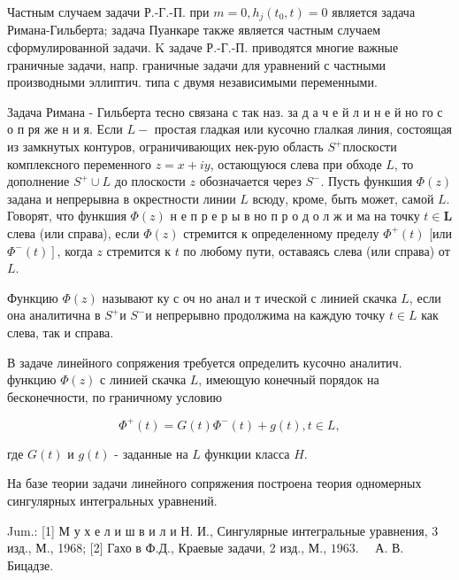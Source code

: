 \documentclass[10pt]{article}
\begin{document}
Частным случаем задачи Р.-Г.-П. при $m=0, h_{j}\left(t_{0}, t\right)=0$ является задача Римана-Гильберта; задача Пуанкаре также является частным случаем сформулированной задачи. K задаче Р.-Г.-П. приводятся многие важные граничные задачи, напр. граничные задачи для уравнений с частными производными эллиптич. типа с двумя независимыми переменными.



Задача Римана - Гильберта тесно связана с так наз. за д а ч е й л и н е й но го с о п ря же н и я. Если $L-$ простая гладкая или кусочно глалкая линия, состоящая из замкнутых контуров, ограничивающих нек-рую область $S^{+}$плоскости комплексного переменного $z=x+i y$, остающуюся слева при обходе $L$, то дополнение $S^{+} \cup L$ до плоскости $z$ обозначается через $S^{-}$. Пусть функшия $\Phi(z)$ задана и непрерывна в окрестности линии $L$ всюду, кроме, быть может, самой $L$. Говорят, что функшия $\Phi(z)$ н е п р е р ы в но п р о д о л ж и ма на точку $t \in \boldsymbol{L}$ слева (или справа), если $\Phi(z)$ стремится к определенному пределу $\Phi^{+}(t)$ [или $\left.\Phi^{-}(t)\right]$, когда $z$ стремится к $t$ по любому пути, оставаясь слева (или справа) от $L$.



Функцию $\Phi(z)$ называют ку с оч но анал и т ической с линией скачка $L$, если она аналитична в $S^{+}$и $S^{-}$и непрерывно продолжима на каждую точку $t \in L$ как слева, так и справа.



В задаче линейного сопряжения требуется определить кусочно аналитич. функцию $\Phi(z)$ с линией скачка $L$, имеющую конечный порядок на бесконечности, по граничному условию



\[

\Phi^{+}(t)=G(t) \Phi^{-}(t)+g(t), t \in L,

\]



где $G(t)$ и $g(t)$ - заданные на $L$ функции класса $H$.



На базе теории задачи линейного сопряжения построена теория одномерных сингулярных интегральных уравнений.



Jum.: [1] М у х е л и ш в и л и Н. И., Сингулярные интегральные уравнения, 3 изд., М., 1968; [2] Гахо в Ф.Д., Краевые задачи, 2 изд., М., $1963 . \quad$ А. В. Бицадзе.
\end{document}
